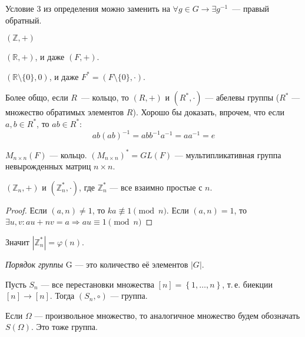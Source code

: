 \begin{exercise}
  Условие 3 из определения можно заменить на $\forall g \in G \to \exists g^{-1}$~--- правый обратный.
\end{exercise}

\begin{example}
	$(\mathbb{Z}, +)$
\end{example}

\begin{example}
  $(\mathbb{R}, +)$, и даже $(F, +)$.
\end{example}

\begin{example}
  $(\mathbb{R}\setminus\{0\}, 0)$, и даже $F^* = (F\setminus\{0\}, \cdot)$.
\end{example}

\begin{remark*}
  Более общо, если $R$~--- кольцо, то $(R, +)$ и $(R^*, \cdot)$ --- абелевы группы ($R^*$ --- множество обратимых элементов $R$).
  Хорошо бы доказать, впрочем, что если $a, b \in R^*$, то $ab \in R^*$:
  \begin{equation*}
	ab(ab)^{-1} = abb^{-1}a^{-1} = aa^{-1} = e
  \end{equation*}
\end{remark*}

\begin{example}
  $M_{n\times n}(F)$ --- кольцо. $(M_{n\times n})^* = GL(F)$ --- мультипликативная группа невырожденных матриц $n\times n$.
\end{example}

\begin{example}
  $(\mathbb{Z}_n, +)$ и $(\mathbb{Z}_n^*, \cdot)$, где $\mathbb{Z}_n^*$ --- все взаимно простые с $n$.
\end{example}

\begin{proof}
  Если $(a, n) \neq 1$, то $ka \not\equiv 1 \pmod{n}$. Если $(a, n) = 1$, то $\exists u, v: au + nv = a	\Rightarrow	au \equiv 1 \pmod{n}$
\end{proof}
Значит $|\mathbb{Z}_n^*| = \varphi(n)$.

\begin{define*}
  \emph{Порядок группы} G --- это количество её элементов $|G|$.
\end{define*}

\begin{example}
  Пусть $S_n$ --- все перестановки множества $[n] = \left\{ 1, \ldots, n \right\}$, т.\,е. биекции $[n] \to [n]$. Тогда $(S_n, \circ)$ --- группа.

  Если $\Omega$ --- произвольное множество, то аналогичное множество будем обозначать $S(\Omega)$. Это тоже группа.
\end{example}

